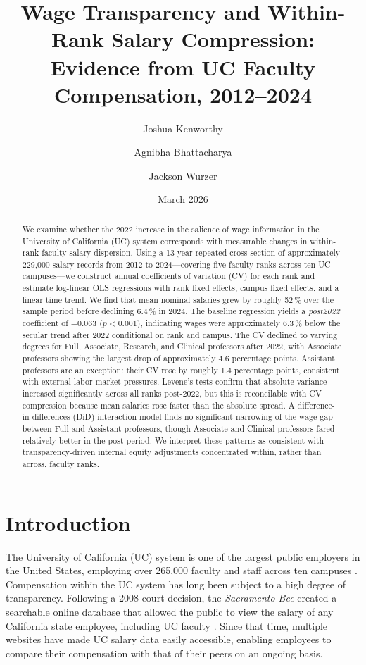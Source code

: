 \documentclass[12pt]{article}
\title{\textbf{Wage Transparency and Within-Rank Salary Compression:\\
Evidence from UC Faculty Compensation, 2012--2024}}
\author{
  Joshua Kenworthy \and
  Agnibha Bhattacharya \and
  Jackson Wurzer
}
\date{March 2026}
\begin{document}
\maketitle
\thispagestyle{empty}

\begin{abstract}
\noindent
We examine whether the 2022 increase in the salience of wage information
in the University of California (UC) system corresponds with measurable
changes in within-rank faculty salary dispersion. Using a 13-year
repeated cross-section of approximately 229,000 salary records from
2012 to 2024---covering five faculty ranks across ten UC campuses---we
construct annual coefficients of variation (CV) for each rank and
estimate log-linear OLS regressions with rank fixed effects, campus
fixed effects, and a linear time trend. We find that mean nominal
salaries grew by roughly 52\,\% over the sample period before declining
6.4\,\% in 2024. The baseline regression yields a \textit{post2022}
coefficient of $-0.063$ ($p < 0.001$), indicating wages were
approximately 6.3\,\% below the secular trend after 2022 conditional on
rank and campus. The CV declined to varying degrees for Full, Associate, Research,
and Clinical professors after 2022, with Associate professors showing
the largest drop of approximately 4.6 percentage points. Assistant
professors are an exception: their CV rose by roughly 1.4 percentage
points, consistent with external labor-market pressures. Levene's tests
confirm that absolute variance increased significantly across all ranks
post-2022, but this is reconcilable with CV compression because mean
salaries rose faster than the absolute spread. A
difference-in-differences (DiD) interaction model finds no significant
narrowing of the wage gap between Full and Assistant professors, though
Associate and Clinical professors fared relatively better in the
post-period. We interpret these patterns as consistent with
transparency-driven internal equity adjustments concentrated within,
rather than across, faculty ranks.
\end{abstract}

\newpage
\tableofcontents
\newpage

\section{Introduction}
\label{sec:intro}

The University of California (UC) system is one of the largest public
employers in the United States, employing over 265,000 faculty and staff
across ten campuses \citep{UC2025}. Compensation within the UC system has
long been subject to a high degree of transparency. Following a 2008
court decision, the \textit{Sacramento Bee} created a searchable online
database that allowed the public to view the salary of any California
state employee, including UC faculty \citep[p.~2982]{card2012}. Since
that time, multiple websites have made UC salary data easily accessible,
enabling employees to compare their compensation with that of their peers
on an ongoing basis.
\end{document}
